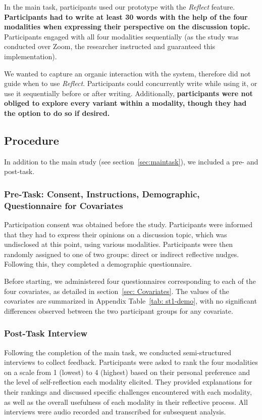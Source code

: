 In the main task, participants used our prototype with the \textit{Reflect} feature. \textbf{Participants had to write at least 30 words with the help of the four modalities when expressing their perspective on the discussion topic.} Participants engaged with all four modalities sequentially (as the study was conducted over Zoom, the researcher instructed and guaranteed this implementation). 

We wanted to capture an organic interaction with the system, therefore did not guide when to use \textit{Reflect}. Participants could concurrently write while using it, or use it sequentially before or after writing. Additionally, \textbf{participants were not obliged to explore every variant within a modality, though they had the option to do so if desired.}

\subsection{Procedure}
\label{sec: procedure}
In addition to the main study (see section~\ref{sec:maintask}), we included a pre- and post-task.

\subsubsection{Pre-Task: Consent, Instructions, Demographic, Questionnaire for Covariates}
Participation consent was obtained before the study. Participants were informed that they had to express their opinions on a discussion topic, which was undisclosed at this point, using various modalities. Participants were then randomly assigned to one of two groups: direct or indirect reflective nudges. Following this, they completed a demographic questionnaire.

Before starting, we administered four questionnaires corresponding to each of the four covariates, as detailed in section~\ref{sec: Covariates}. The values of the covariates are summarized in Appendix Table~\ref{tab: st1-demo}, with no significant differences observed between the two participant groups for any covariate.

\subsubsection{Post-Task Interview}
Following the completion of the main task, we conducted semi-structured interviews to collect feedback. Participants were asked to rank the four modalities on a scale from 1 (lowest) to 4 (highest) based on their personal preference and the level of self-reflection each modality elicited. They provided explanations for their rankings and discussed specific challenges encountered with each modality, as well as the overall usefulness of each modality in their reflective process. All interviews were audio recorded and transcribed for subsequent analysis.

